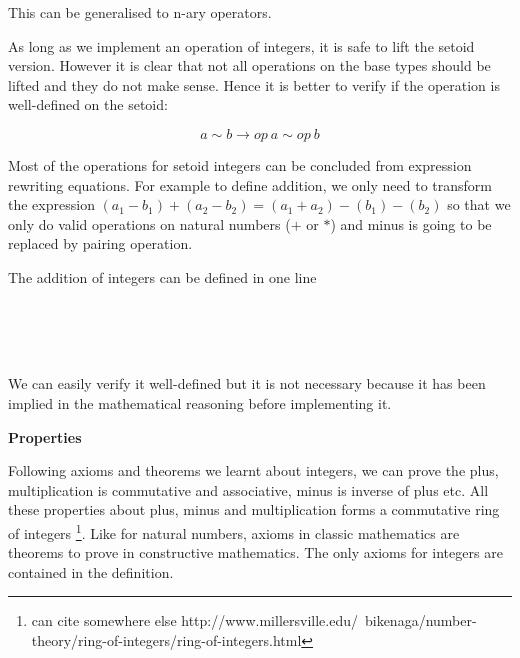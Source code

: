 This can be generalised to n-ary operators.

As long as we implement an operation of integers, it is safe to lift
the setoid version. However it is clear that not all operations on the
base types should be lifted and they do not make sense. Hence it is
better to verify if the operation is well-defined on the setoid:

$$a \sim b → op~a \sim op~b$$



Most of the operations for setoid integers can be concluded from
expression rewriting equations. For example to define addition, 
we only need to transform the expression  
$(a_1 - b_1) + (a_2 - b_2) = (a_1 + a_2) - (b_1) - (b_2)$
so that we only do valid
operations on natural numbers ($+$ or $*$) and minus is going to be
replaced by pairing operation.

The addition of integers can be defined in one line

\begin{code}
\\
\>\AgdaFunction{\_+\_} \AgdaSymbol{:}     \<%
\\
\>\AgdaSymbol{(} \AgdaInductiveConstructor{,} \AgdaSymbol{)} \AgdaFunction{+} \AgdaSymbol{(} \AgdaInductiveConstructor{,} \AgdaSymbol{)} \AgdaSymbol{=} \AgdaSymbol{(}  \AgdaSymbol{)} \AgdaInductiveConstructor{,} \AgdaSymbol{(}  \AgdaSymbol{)}\<%
\\
\end{code}

We can easily verify it well-defined but it is not necessary because
it has been implied in the mathematical reasoning before implementing it.



\textbf{\large{Properties}}

Following axioms and theorems we learnt about integers, we can prove
the plus, multiplication is commutative and associative, minus is
inverse of plus etc. All these properties about plus, minus and
multiplication forms a commutative ring of integers \footnote{can cite
somewhere else http://www.millersville.edu/~bikenaga/number-theory/ring-of-integers/ring-of-integers.html}.
Like for natural numbers, axioms in classic mathematics are theorems
to prove in constructive mathematics. The only axioms for integers are
contained in the definition.

